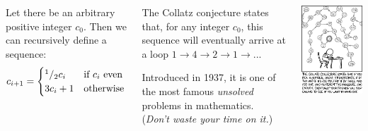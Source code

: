 
\begin{frame}
%
\begin{columns}[T]
\vspace{-9pt}
\begin{defbox}
\small
Let there be an arbitrary positive integer $c_0$. Then we can recursively define a sequence:
\begin{align*}
	c_{i+1} = \begin{cases}
	{}^{1}/_{2} c_i & \text{if~} c_i \text{~even}\\
	3 c_i + 1 & \text{otherwise}
	\end{cases}
\end{align*}
\end{defbox}
%
\begin{hintbox}
\small
The Collatz conjecture states that, for any integer $c_0$, this sequence will eventually arrive at a loop $1 \to 4 \to 2 \to 1 \to ...$

Introduced in 1937, it is one of the most famous \emph{unsolved} problems in mathematics.\\
(\Thus \emph{Don't waste your time on it.})
\end{hintbox}
%
\includegraphics[width=.9\linewidth]{./gfx/03-xkcd-collatz}


\end{columns}
\end{frame}
